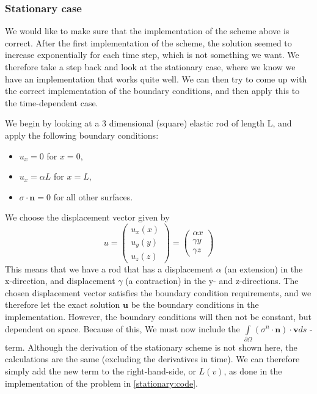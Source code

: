 \documentclass[twoside]{article}
\begin{document}
\subsubsection{Stationary case}

We would like to make sure that the implementation of the scheme above is correct. After the first implementation of the scheme, the solution seemed to increase exponentially for each time step, which is not something we want. We therefore take a step back and look at the stationary case, where we know we have an implementation that works quite well. We can then try to come up with the correct implementation of the boundary conditions, and then apply this to the time-dependent case. 

We begin by looking at a 3 dimensional (square) elastic rod of length L, and apply the following boundary conditions:
\begin{itemize}
\item $u_x = 0$ for $x = 0$,
\item $u_x = \alpha L$ for $x = L$,
\item $\sigma\cdot\mathbf{n} = 0$ for all other surfaces.
\end{itemize}

We choose the displacement vector given by
\begin{equation}
u = \left(\begin{matrix}
u_x(x)\\
u_y(y)\\
u_z(z)
\end{matrix}\right) 
= 
\left(\begin{matrix}
\alpha x\\
\gamma y\\
\gamma z
\end{matrix}\right) \label{u:vector}
\end{equation}
This means that we have a rod that has a displacement $\alpha$ (an extension) in the x-direction, and displacement $\gamma$ (a contraction) in the y- and z-directions. The chosen displacement vector satisfies the boundary condition requirements, and we therefore let the exact solution $\mathbf{u}$ be the boundary conditions in the implementation. However, the boundary conditions will then not be constant, but dependent on space. Because of this, We must now include the $\int\limits_{\partial\Omega} (\sigma^n\cdot \mathbf{n})\cdot \mathbf{v} ds$ - term. Although the derivation of the stationary scheme is not shown here, the calculations are the same (excluding the derivatives in time). We can therefore simply add the new term to the right-hand-side, or $L(v)$, as done in the implementation of the problem in \ref{stationary:code}.
\end{document}
